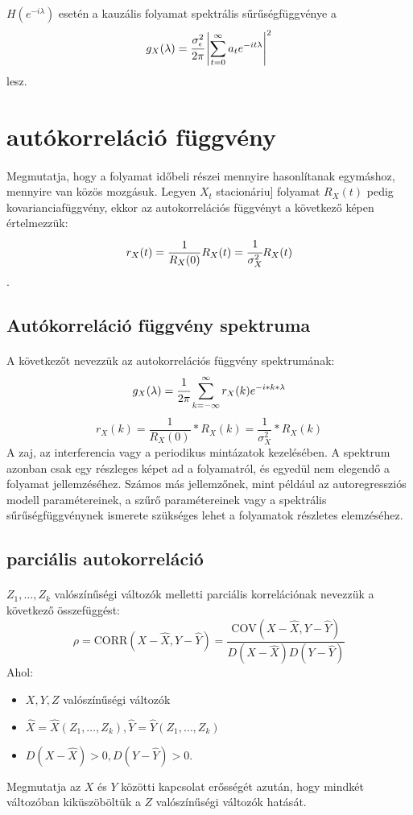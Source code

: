 \documentclass[11pt,a4paper]{article}
\begin{document}
					\paragraph{}
						$H \left(e^{-i \lambda} \right)$ esetén a kauzális folyamat spektrális sűrűségfüggvénye a
						$$g_X(\lambda) = \cfrac{\sigma_\epsilon^2}{2 \pi} \left| \sum_{t=0}^\infty a_t e^{-it\lambda}\right|^2$$ lesz.
			\section{autókorreláció függvény}
				\paragraph{}
					Megmutatja, hogy a folyamat időbeli részei mennyire hasonlítanak egymáshoz, mennyire van közös mozgásuk.
					Legyen $X_t$ stacionáriu] folyamat $R_X(t)$ pedig kovarianciafüggvény, ekkor az autokorrelációs függvényt a következő képen értelmezzük:
					$$r_X(t) = \dfrac{1}{R_X(0)}R_X(t) = \cfrac{1}{\sigma_X^2}R_X(t)$$.
				\subsection{Autókorreláció függvény spektruma}
					\paragraph{}
						A következőt nevezzük az autokorrelációs függvény spektrumának:
						$$g_X(\lambda) = \cfrac{1}{2 \pi} \sum_{k = - \infty} ^{\infty} r_X(k) e^{-i * k *\lambda}$$
						$$r_X(k) = \dfrac{1}{R_X(0)}*R_X(k) = \dfrac{1}{\sigma^2_X}*R_X(k)$$
						A zaj, az interferencia vagy a periodikus mintázatok kezelésében. A spektrum azonban csak egy részleges képet ad a folyamatról, és egyedül nem elegendő a folyamat jellemzéséhez. Számos más jellemzőnek, mint például az autoregressziós modell paramétereinek, a szűrő paramétereinek vagy a spektrális sűrűségfüggvénynek ismerete szükséges lehet a folyamatok részletes elemzéséhez.
				\subsection{parciális autokorreláció}
					\paragraph{}
						$Z_1, \dots, Z_k$ valószínűségi változók melletti parciális korrelációnak nevezzük a következő összefüggést:
						$$\rho = \mathrm{CORR}(X - \hat{X}, Y - \hat{Y}) = \frac{\mathrm{COV}(X-\hat{X}, Y - \hat{Y})}{D(X - \hat{X})D(Y - \hat{Y})}$$
						Ahol:
						\begin{itemize}
							\item $X,Y,Z$ valószínűségi változók
							\item $\hat{X} = \hat{X}(Z_1, \dots, Z_k), \hat{Y} = \hat{Y}(Z_1, \dots, Z_k)$
							\item $D(X - \hat{X}) > 0, D(Y - \hat{Y}) > 0$.
						\end{itemize}
						Megmutatja az $X$ és $Y$ közötti kapcsolat erősségét azután, hogy mindkét változóban kiküszöböltük a $Z$ valószínűségi változók hatását.
\end{document}
